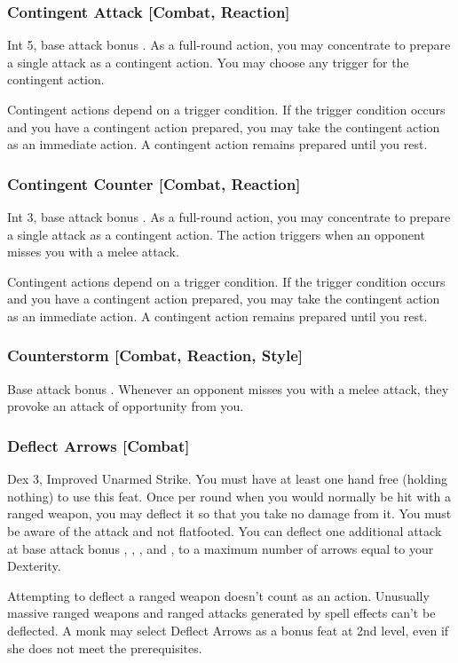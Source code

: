 \subsubsection{Contingent Attack [Combat, Reaction]}
\featpre Int 5, base attack bonus .
\featben As a full-round action, you may concentrate to prepare a single attack as a contingent action. You may choose any trigger for the contingent action.

Contingent actions depend on a trigger condition. If the trigger condition occurs and you have a contingent action prepared, you may take the contingent action as an immediate action. A contingent action remains prepared until you rest.

\subsubsection{Contingent Counter [Combat, Reaction]}
\featpre Int 3, base attack bonus .
\featben As a full-round action, you may concentrate to prepare a single attack as a contingent action. The action triggers when an opponent misses you with a melee attack.

Contingent actions depend on a trigger condition. If the trigger condition occurs and you have a contingent action prepared, you may take the contingent action as an immediate action. A contingent action remains prepared until you rest.

\subsubsection{Counterstorm [Combat, Reaction, Style]}
\featpre Base attack bonus .
\featben Whenever an opponent misses you with a melee attack, they provoke an attack of opportunity from you.

\subsubsection{Deflect Arrows [Combat]}
 Dex 3, Improved Unarmed Strike.
 You must have at least one hand free (holding nothing) to use this feat. Once per round when you would normally be hit with a ranged weapon, you may deflect it so that you take no damage from it. You must be aware of the attack and not flatfooted. You can deflect one additional attack at base attack bonus , , , and , to a maximum number of arrows equal to your Dexterity.
\par Attempting to deflect a ranged weapon doesn't count as an action. Unusually massive ranged weapons and ranged attacks generated by spell effects can't be deflected.
 A monk may select Deflect Arrows as a bonus feat at 2nd level, even if she does not meet the prerequisites.

